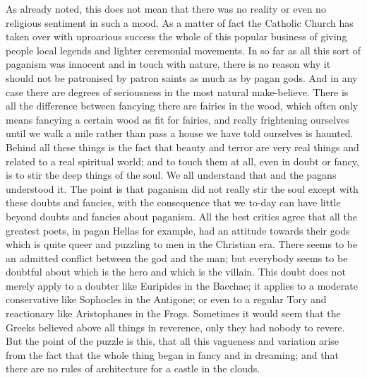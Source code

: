 As already noted, this does not mean that there was no reality or even no religious sentiment in such a mood. As a matter of fact the Catholic Church has taken over with uproarious success the whole of this popular business of giving people local legends and lighter ceremonial movements. In so far as all this sort of paganism was innocent and in touch with nature, there is no reason why it should not be patronised by patron saints as much as by pagan gods. And in any case there are degrees of seriousness in the most natural make-believe. There is all the difference between fancying there are fairies in the wood, which often only means fancying a certain wood as fit for fairies, and really frightening ourselves until we walk a mile rather than pass a house we have told ourselves is haunted. Behind all these things is the fact that beauty and terror are very real things and related to a real spiritual world; and to touch them at all, even in doubt or fancy, is to stir the deep things of the soul. We all understand that and the pagans understood it. The point is that paganism did not really stir the soul except with these doubts and fancies, with the consequence that we to-day can have little beyond doubts and fancies about paganism. All the best critics agree that all the greatest poets, in pagan Hellas for example, had an attitude towards their gods which is quite queer and puzzling to men in the Christian era. There seems to be an admitted conflict between the god and the man; but everybody seems to be doubtful about which is the hero and which is the villain. This doubt does not merely apply to a doubter like Euripides in the Bacchae; it applies to a moderate conservative like Sophocles in the Antigone; or even to a regular Tory and reactionary like Aristophanes in the Frogs. Sometimes it would seem that the Greeks believed above all things in reverence, only they had nobody to revere. But the point of the puzzle is this, that all this vagueness and variation arise from the fact that the whole thing began in fancy and in dreaming; and that there are no rules of architecture for a castle in the clouds.

